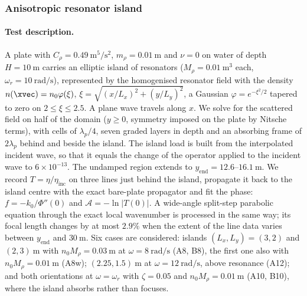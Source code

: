 {\color{red}
\subsubsection{Anisotropic resonator island}\label{subsubsec:num_L4_4}

\paragraph{Test description.} A plate with $C_\rho=0.49~\si{\meter\tothe{5}\per\second\squared}$, $m_\rho=0.01~\si{\meter}$ and $\nu=0$ on water of depth $H=10~\si{\meter}$ carries an elliptic island of resonators ($M_\rho=0.01~\si{\meter\cubed}$ each, $\omega_r=10~\si{\radian\per\second}$), represented by the homogenised resonator field with the density $n(\xvec)=n_0\varphi(\xi)$, $\xi=\sqrt{(x/L_x)^2+(y/L_y)^2}$, a Gaussian $\varphi=e^{-\xi^2/2}$ tapered to zero on $2\le\xi\le2.5$. A plane wave travels along $x$. We solve for the scattered field on half of the domain ($y\ge0$, symmetry imposed on the plate by Nitsche terms), with cells of $\lambda_p/4$, seven graded layers in depth and an absorbing frame of $2\lambda_p$ behind and beside the island. The island load is built from the interpolated incident wave, so that it equals the change of the operator applied to the incident wave to $6\times10^{-13}$. The undamped region extends to $y_\mathrm{end}=12.6$--$16.1~\si{\meter}$. We record $T=\eta/\eta_\mathrm{inc}$ on three lines just behind the island, propagate it back to the island centre with the exact bare-plate propagator and fit the phase: $f=-k_0/\Phi''(0)$ and $\mathcal A=-\ln|T(0)|$. A wide-angle split-step parabolic equation through the exact local wavenumber is processed in the same way; its focal length changes by at most $2.9\%$ when the extent of the line data varies between $y_\mathrm{end}$ and $30~\si{\meter}$. Six cases are considered: islands $(L_x,L_y)=(3,2)$ and $(2,3)~\si{\meter}$ with $n_0M_\rho=0.03~\si{\meter}$ at $\omega=8~\si{\radian\per\second}$ (A8, B8), the first one also with $n_0M_\rho=0.01~\si{\meter}$ (A8w); $(2.25,1.5)~\si{\meter}$ at $\omega=12~\si{\radian\per\second}$, above resonance (A12); and both orientations at $\omega=\omega_r$ with $\zeta=0.05$ and $n_0M_\rho=0.01~\si{\meter}$ (A10, B10), where the island absorbs rather than focuses.

}
